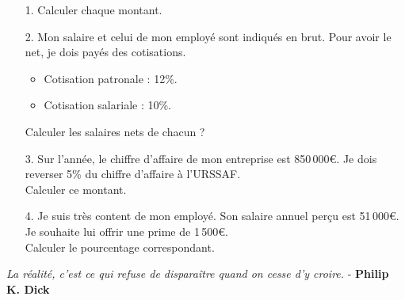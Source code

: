 \begin{enumerate}
  \item[1.] Calculer chaque montant.
  \item[2.] Mon salaire et celui de mon employé sont indiqués en brut. Pour avoir le net, je dois payés des cotisations.
  \begin{itemize}[label={$\bullet$}]
    \item Cotisation patronale : 12\%.
    \item Cotisation salariale : 10\%.
  \end{itemize}
  Calculer les salaires nets de chacun ?
  \item[3.] Sur l'année, le chiffre d'affaire de mon entreprise est 850\,000€. Je dois reverser 5\% du chiffre d'affaire à l'URSSAF. \\
  Calculer ce montant.
  \item[4.] Je suis très content de mon employé. Son salaire annuel perçu est 51\,000€. Je souhaite lui offrir une prime de 1\,500€. \\
  Calculer le pourcentage correspondant. 
\end{enumerate}

\newpage

\begin{center}
  \textit{La réalité, c'est ce qui refuse de disparaître quand on cesse d'y croire.}  - \textbf{Philip K. Dick}
\end{center}

